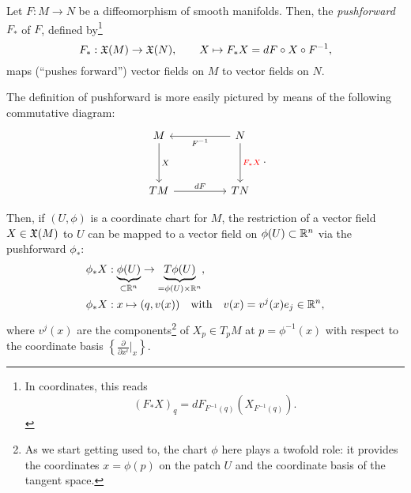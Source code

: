\begin{definition}
  Let $F:M\to N$ be a diffeomorphism of smooth manifolds.
  Then, the \emph{pushforward} $F_*$ of $F$, defined by\footnote{In coordinates, this reads\begin{equation}
      (F_* X)_q = dF_{F^{-1}(q)}(X_{F^{-1}(q)}).
    \end{equation}}
  \begin{equation}
    F_*: \mathfrak{X}(M) \to \mathfrak{X}(N),\qquad
    X \mapsto F_* X = d F \circ X \circ F^{-1},
  \end{equation}
  maps (``pushes forward'') vector fields on $M$ to vector fields on $N$.
\end{definition}

The definition of pushforward is more easily pictured by means of the following commutative diagram:
\begin{equation}
  \begin{tikzcd}[row sep=huge, column sep=huge]
    M \arrow[d, "X"]
    & N \arrow[l, "F^{-1}"] \arrow[d, "F_*X" red]\\
    TM \arrow[r, "d F"]
    & TN
  \end{tikzcd}.
\end{equation}

Then, if $(U, \phi)$ is a coordinate chart for $M$, the restriction of a vector field $X\in\mathfrak{X}(M)$ to $U$ can be mapped to a vector field on $\phi(U)\subset\mathbb{R}^n$ via the pushforward $\phi_*$:
\begin{align}
  \phi_* X & : \LaTeXunderbrace{\phi(U)}_{\subset\R^n} \to \LaTeXunderbrace{T \phi(U)}_{=\phi(U)\times\R^n}, \\
  \phi_* X & : x\mapsto (q,v(x)) \quad\mbox{with}\quad v(x) = v^j(x)e_j \in \R^n,
\end{align}
where $v^j(x)$ are the components\footnote{As we start getting used to, the chart $\phi$ here plays a twofold role: it provides the coordinates $x=\phi(p)$ on the patch $U$ and the coordinate basis of the tangent space.} of $X_p\in T_p M$ at $p=\phi^{-1}(x)$ with respect to the coordinate basis $\left\{\frac{\partial}{\partial x^i}\big|_x\right\}$.



